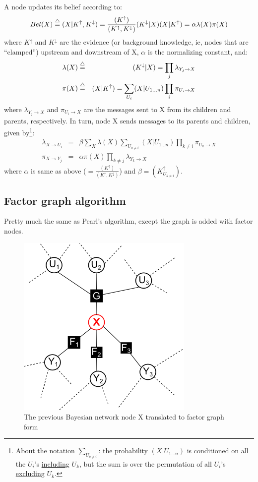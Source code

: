 A node updates its belief according to:
\begin{equation}
Bel(X) \stackrel{\triangle}{=} (X|K^\uparrow,K^\downarrow) = \frac{(K^\uparrow)}{(K^\uparrow,K^\downarrow)}
   (K^\downarrow|X)(X|K^\uparrow) = \alpha \lambda(X) \pi(X)
\end{equation}
where $K^\uparrow$ and $K^\downarrow$ are the evidence (or background knowledge, ie, nodes that
 are ``clamped'') upstream and downstream of X, $\alpha$ is the normalizing constant, and:
\begin{eqnarray}
\lambda(X) &\stackrel{\triangle}{=}& (K^\downarrow|X) = \prod_j \lambda_{Y_j \rightarrow X} \\
    \pi(X) &\stackrel{\triangle}{=}& (X|K^\uparrow) = \sum_{U_i} (X|U_{1...n}) \prod_i \pi_{U_i \rightarrow X}
\end{eqnarray}
where $\lambda_{Y_j \rightarrow X}$ and $\pi_{U_i \rightarrow X}$ are the messages sent to X
from its children and parents, respectively.  In turn, node X sends messages to its parents
and children, given by\footnote{About the notation $\sum_{U_{k \neq i}}$: the probability
 $(X|U_{1...n})$ is conditioned on all the $U_i$'s \underline{including} $U_k$, but the sum is
 over the permutation of all $U_i$'s \underline{excluding} $U_k$. }:
\begin{eqnarray}
\lambda_{X \rightarrow U_i} &=& \beta \sum_X \lambda(X) \sum_{U_{k \neq i}} (X|U_{1...n}) 
         \prod_{k \neq i} \pi_{U_k \rightarrow X} \\
\pi_{X \rightarrow Y_j} &=& \alpha \pi(X) \prod_{k \neq j} \lambda_{Y_k \rightarrow X}
\end{eqnarray}
where $\alpha$ is same as above ($= \frac{ (K^\uparrow) }{ (K^\uparrow,K^\downarrow) } $) and
 $\beta = (K^\uparrow_{U_{k \neq i}})$.

\subsection{Factor graph algorithm}

Pretty much the same as Pearl's algorithm, except the graph is added with factor nodes.

\begin{figure}[h]
\centering
\includegraphics{factor-graph-typical-node.png}
\caption{The previous Bayesian network node X translated to factor graph form}
\end{figure}

